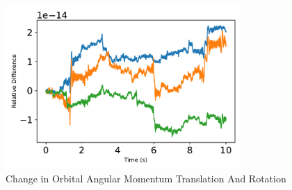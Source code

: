 \begin{figure}[htbp]\centerline{\includegraphics[width=0.8\textwidth]{AutoTeX/scPlusChangeInOrbitalAngularMomentumTranslationAndRotation}}\caption{Change in Orbital Angular Momentum Translation And Rotation}\label{fig:scPlusChangeInOrbitalAngularMomentumTranslationAndRotation}\end{figure}